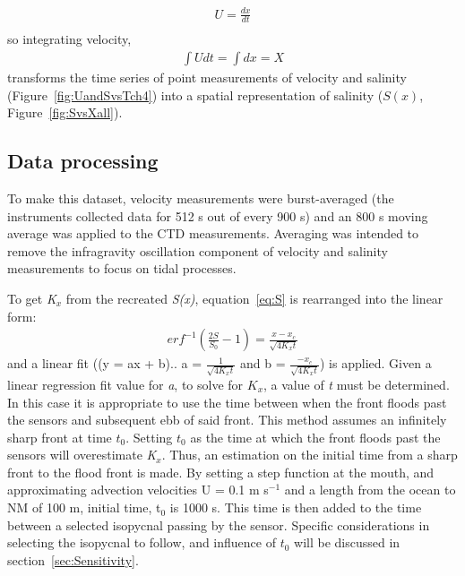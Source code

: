 \begin{eqnarray}
U = \frac{dx}{dt} \label{eq:uEdxdt}\\
\end{eqnarray}
so integrating velocity,
\begin{eqnarray}
\int{Udt} = \int{dx} = X \label{eq:intuEx}
\end{eqnarray}
transforms the time series of point measurements of velocity and salinity (Figure~\ref{fig:UandSvsTch4}) into a spatial representation of salinity ($S(x)$, Figure~\ref{fig:SvsXall}).

\subsection{Data processing} \label{ssec:DataProcessing}
To make this dataset, velocity measurements were burst-averaged (the instruments collected data for 512 s out of every 900 s) and an 800 s moving average was applied to the CTD measurements.  Averaging was intended to remove the infragravity oscillation component of velocity and salinity measurements to focus on tidal processes. 

To get \emph{K$_x$} from the recreated \emph{S(x)}, equation~\ref{eq:S} is rearranged into the linear form:
\begin{eqnarray}
erf^{-1}\left(\frac{2S}{S_0}-1\right) = \frac{x-x_c}{\sqrt{4K_xt}} \label{eq:linfitS}
\end{eqnarray}
and a linear fit ((y = ax + b).. a = $\frac{1}{\sqrt{4K_xt}}$ and b = $\frac{-x_c}{\sqrt{4K_xt}}$) is applied. Given a linear regression fit value for \emph{a}, to solve for $K_x$, a value of \emph{t} must be determined. In this case it is appropriate to use the time between when the front floods past the sensors and subsequent ebb of said front. This method assumes an infinitely sharp front at time $t_0$. Setting $t_0$ as the time at which the front floods past the sensors will overestimate \emph{K$_x$}. Thus, an estimation on the initial time from a sharp front to the flood front is made. By setting a step function at the mouth, and approximating advection velocities U = 0.1 m s$^{-1}$ and a length from the ocean to NM of 100 m, initial time, t$_0$ is 1000 s. This time is then added to the time between a selected isopycnal passing by the sensor. Specific considerations in selecting the isopycnal to follow, and influence of $t_0$ will be discussed in section~\ref{sec:Sensitivity}.




